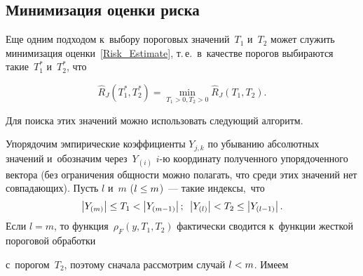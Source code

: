 \begin{multicols}{2}
\vspace*{-4pt}

\section{Минимизация оценки риска}

\vspace*{-4pt}

Еще одним подходом к~выбору пороговых значений~$T_1$ и~$T_2$ может служить 
минимизация оценки~\eqref{Risk_Estimate}, т.\,е.\ в~качестве порогов выбираются 
такие~$T^*_1$ и~$T^*_2$, что

\vspace*{1pt}

\noindent
$$
\widehat{R}_J\left(T^*_1,T^*_2\right)=\min\limits_{T_1>0,T_2>0}\widehat{R}_J\left(T_1,T_2\right).
$$ 

\vspace*{-3pt}

\noindent
Для поиска этих значений можно использовать следующий алгоритм.

Упорядочим эмпирические коэффициенты $Y_{j,k}$ по убыванию абсолютных значений 
и~обозначим через~$Y_{(i)}$ $i$-ю координату полученного упорядоченного вектора 
(без ограничения общности можно полагать, что среди этих значений нет 
совпа\-да\-ющих).
Пусть $l$ и~$m$ ($l\hm\leq m$)~--- такие индексы,~что
\begin{equation}
\label{restrictions}
\left\vert Y_{(m)}\right\vert \leq T_1<\left\vert Y_{(m-1)}\right\vert;\enskip \left\vert Y_{(l)}\right\vert < T_2\leq\left\vert Y_{(l-1)}\right\vert.
\end{equation}
Если $l=m$, то функция~$\rho_{F}(y,T_1,T_2)$ фактически сводится к~функции 
жесткой пороговой обработки\linebreak\vspace*{-12pt}

\pagebreak

\noindent
 с~порогом~$T_2$, поэтому сначала рассмотрим случай 
$l\hm<m$.
Имеем

\vspace*{-3pt}


\end{multicols}
